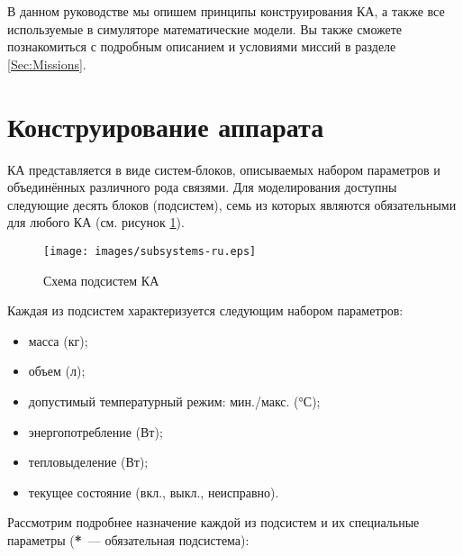\documentclass[12pt,a4paper]{article}
\begin{document}
В данном руководстве мы опишем принципы конструирования КА, а также все используемые в
симуляторе математические модели. Вы также сможете познакомиться с подробным описанием и
условиями миссий в разделе \ref{Sec:Missions}.

\section{Конструирование аппарата}

КА представляется в виде систем-блоков, описываемых набором параметров и объединённых
различного рода связями. Для моделирования доступны следующие десять блоков (подсистем),
семь из которых являются обязательными для любого КА (см. рисунок \ref{Pic:subsystems}).

\begin{figure}[tbh]
  \begin{center}
    \texttt{[image: images/subsystems-ru.eps]}
    \caption{Схема подсистем КА}
    \label{Pic:subsystems}
  \end{center}
\end{figure}

Каждая из подсистем характеризуется следующим набором параметров:

\begin{itemize}
\item масса (кг);
\item объем (л);
\item допустимый температурный режим: мин./макс. (°С);
\item энергопотребление (Вт);
\item тепловыделение (Вт);
\item текущее состояние (вкл., выкл., неисправно).
\end{itemize}

Рассмотрим подробнее назначение каждой из подсистем и их специальные параметры
(\textbf{*}~--- обязательная подсистема):
\end{document}
